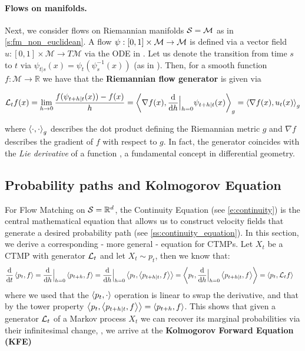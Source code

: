 \documentclass{fairmeta}
\newcommand{\highlight}[1]{{\color{metablue} \textbf{#1}}}
\renewcommand{\eqref}[1]{\labelcref{#1}}
\numberwithin{equation}{section}
\begin{document}
\paragraph{Flows on manifolds.} Next, we consider flows on Riemannian manifolds ${\mathcal{S}}={\mathcal{M}}$ as in \cref{s:fm_non_euclidean}. A flow $\psi:[0,1]\times {\mathcal{M}}\rightarrow{\mathcal{M}}$ is defined via a vector field $u:[0,1]\times \mathcal{M}\to T\mathcal{M}$ via the ODE in \eqref{e:flow}. 
Let us denote the transition from time $s$ to $t$ via $\psi_{t|s}(x)=\psi_t(\psi_s^{-1}(x))$ (as in \eqref{e:flow_is_markov}). Then, 
for a smooth function $f:\mathcal{M}\to\mathbb{R}$ we have that the \highlight{Riemannian flow generator} is given via
\begin{myframe}
\begin{align}
\label{eq:generator_manifold_flows}
    \mathcal{L}_tf(x) = \lim\limits_{h\to 0}\frac{f(\psi_{t+h|t}(x))-f(x)}{h}=\left \langle \nabla f(x), \frac{\mathrm{d}}{\mathrm{d}  h}\Big\vert_{h=0}\psi_{t+h|t}(x) \right \rangle_{g}=\left \langle \nabla f(x), u_t(x) \right \rangle_{g}
\end{align}
\end{myframe}
where $\left \langle \cdot,\cdot \right \rangle_{g}$ describes the dot product defining the Riemannian metric $g$ and $\nabla f$ describes the gradient of $f$ with respect to $g$. In fact, the generator  coincides with the \emph{Lie derivative} of a function \citep{jost2008riemannian}, a fundamental concept in differential geometry.

\subsection{Probability paths and Kolmogorov Equation} 


For Flow Matching on ${\mathcal{S}}=\mathbb{R}^d$, the Continuity Equation (see \ref{e:continuity}) is the central mathematical equation that allows us to construct velocity fields that generate a desired probability path (see \cref{ss:continuity_equation}). In this section, we derive a corresponding - more general - equation for CTMPs. Let $X_t$ be a CTMP with generator ${\mathcal{L}}_t$ and let $X_t\sim p_t$, then we know that:
\begin{align*}
    \frac{\mathrm{d}}{\mathrm{d} t}\left \langle p_t, f\right \rangle
    &=\frac{\mathrm{d}}{\mathrm{d} h}\Big\vert_{h=0}\left \langle p_{t+h}, f\right \rangle
        =\frac{\mathrm{d}}{\mathrm{d} h}\Big\vert_{h=0}\left \langle p_t, \left \langle p_{t+h|t}, f\right \rangle\right \rangle
    =\left \langle p_t, \frac{\mathrm{d}}{\mathrm{d} h}\Big\vert_{h=0}\left \langle p_{t+h|t}, f\right \rangle\right \rangle
= \left \langle p_t, {\mathcal{L}}_t f\right \rangle
\end{align*}
where we used that the $\left \langle p_t, \cdot\right \rangle$ operation is linear to swap the derivative, and that by the tower property $\left \langle p_{t}, \left \langle p_{t+h|t},  f\right \rangle\right \rangle=\left \langle p_{t+h}, f\right \rangle$. This shows that given a generator ${\mathcal{L}}_t$ of a Markov process $X_t$ we can recover its marginal probabilities via their infinitesimal change, \ie, we arrive at the \highlight{Kolmogorov Forward Equation (KFE)}
\end{document}
